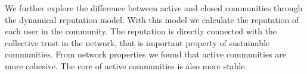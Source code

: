 We further explore the difference between active and closed communities through the dynamical reputation model. With this model we calculate the reputation of each user in the community. The reputation is directly connected with the collective trust in the network, that is important property of sustainable communities. From network properties we found that active communities are more cohesive. The core of active communities is also more stable. 




